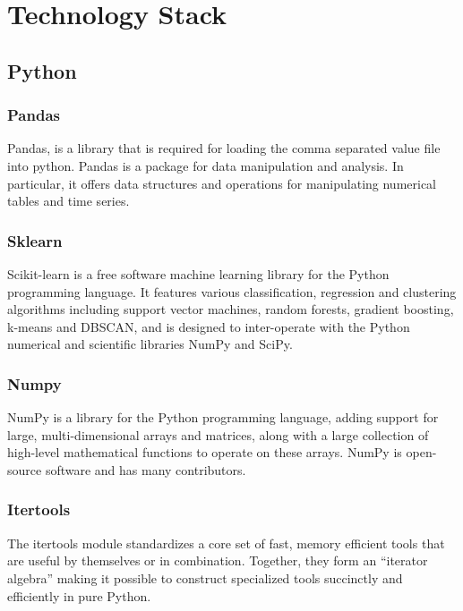 \documentclass[12pt]{article}
\begin{document}
\clearpage
\newpage
\section{Technology Stack}
\subsection{Python}
\subsubsection{Pandas}
Pandas, is a library that is required for loading the comma separated value file into python. Pandas is a package for data manipulation and analysis. In particular, it offers data structures and operations for manipulating numerical tables and time series.\cite{pandas}

\subsubsection{Sklearn}
Scikit-learn is a free software machine learning library for the Python programming language. It features various classification, regression and clustering algorithms including support vector machines, random forests, gradient boosting, k-means and DBSCAN, and is designed to inter-operate with the Python numerical and scientific libraries NumPy and SciPy.\cite{scikit}

\subsubsection{Numpy}
NumPy is a library for the Python programming language, adding support for large, multi-dimensional arrays and matrices, along with a large collection of high-level mathematical functions to operate on these arrays. NumPy is open-source software and has many contributors.\cite{numpy}

\subsubsection{Itertools}
The itertools module standardizes a core set of fast, memory efficient tools that are useful by themselves or in combination. Together, they form an “iterator algebra” making it possible to construct specialized tools succinctly and efficiently in pure Python.\cite{itertools}
\end{document}
